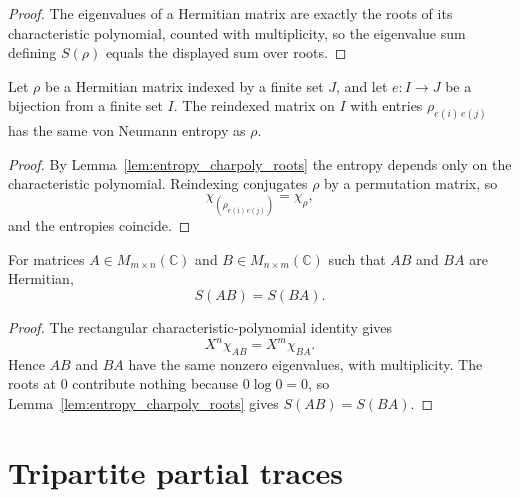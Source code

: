 \begin{proof}\leanok
    The eigenvalues of a Hermitian matrix are exactly the roots of its
    characteristic polynomial, counted with multiplicity, so the eigenvalue sum
    defining $S(\rho)$ equals the displayed sum over roots.
\end{proof}

\begin{theorem}
    \label{thm:entropy_submatrix_equiv}
    \leanok
    Let $\rho$ be a Hermitian matrix indexed by a finite set $J$, and let
    $e : I \to J$ be a bijection from a finite set $I$. The reindexed matrix on
    $I$ with entries $\rho_{e(i)\,e(j)}$ has the same von Neumann entropy as
    $\rho$.
\end{theorem}

\begin{proof}\leanok
    By Lemma~\ref{lem:entropy_charpoly_roots} the entropy depends only on the
    characteristic polynomial. Reindexing conjugates $\rho$ by a permutation
    matrix, so
    \[
        \chi_{(\rho_{e(i)\,e(j)})} = \chi_\rho,
    \]
    and the entropies coincide.
\end{proof}

\begin{theorem}
    \label{thm:entropy_mul_comm}
    \leanok
    For matrices $A \in M_{m \times n}(\mathbb{C})$ and
    $B \in M_{n \times m}(\mathbb{C})$ such that $AB$ and $BA$ are Hermitian,
    \[
        S(AB) = S(BA).
    \]
\end{theorem}

\begin{proof}\leanok
    The rectangular characteristic-polynomial identity gives
    \[
        X^n \chi_{AB} = X^m \chi_{BA}.
    \]
    Hence $AB$ and $BA$ have the same nonzero eigenvalues, with multiplicity.
    The roots at $0$ contribute nothing because $0 \log 0 = 0$, so
    Lemma~\ref{lem:entropy_charpoly_roots} gives $S(AB) = S(BA)$.
\end{proof}

\section{Tripartite partial traces}

